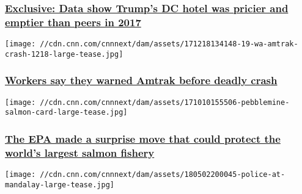 \hypertarget{exclusive-data-show-trumps-dc-hotel-was-pricier-and-emptier-than-peers-in-2017}{%
\subsubsection{\texorpdfstring{\href{/2018/01/27/politics/trump-hotel-occupancy-rates-data/index.html}{Exclusive:
Data show Trump's DC hotel was pricier and emptier than peers in
2017}}{Exclusive: Data show Trump's DC hotel was pricier and emptier than peers in 2017}}\label{exclusive-data-show-trumps-dc-hotel-was-pricier-and-emptier-than-peers-in-2017}}

\href{/2018/01/28/us/amtrak-501-derail-training-safety-investigation/index.html}{}

\texttt{[image: //cdn.cnn.com/cnnnext/dam/assets/171218134148-19-wa-amtrak-crash-1218-large-tease.jpg]}

\hypertarget{workers-say-they-warned-amtrak-before-deadly-crash}{%
\subsubsection{\texorpdfstring{\href{/2018/01/28/us/amtrak-501-derail-training-safety-investigation/index.html}{Workers
say they warned Amtrak before deadly
crash}}{Workers say they warned Amtrak before deadly crash}}\label{workers-say-they-warned-amtrak-before-deadly-crash}}

\href{/2018/01/27/politics/epa-alaska-salmon-fishery/index.html}{}

\texttt{[image: //cdn.cnn.com/cnnnext/dam/assets/171010155506-pebblemine-salmon-card-large-tease.jpg]}

\hypertarget{the-epa-made-a-surprise-move-that-could-protect-the-worlds-largest-salmon-fishery}{%
\subsubsection{\texorpdfstring{\href{/2018/01/27/politics/epa-alaska-salmon-fishery/index.html}{The
EPA made a surprise move that could protect the world's largest salmon
fishery}}{The EPA made a surprise move that could protect the world's largest salmon fishery}}\label{the-epa-made-a-surprise-move-that-could-protect-the-worlds-largest-salmon-fishery}}

\href{/2018/01/16/us/las-vegas-shooting-court-hearing/index.html}{}

\texttt{[image: //cdn.cnn.com/cnnnext/dam/assets/180502200045-police-at-mandalay-large-tease.jpg]}

